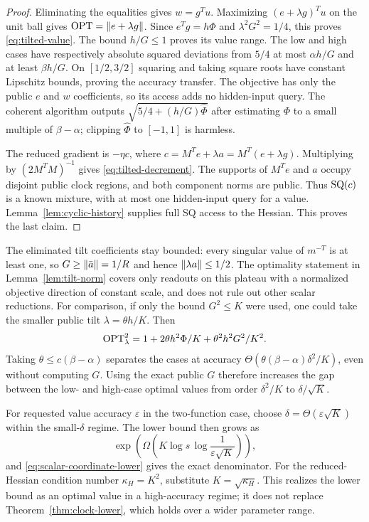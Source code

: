 \begin{proof}
Eliminating the equalities gives $w=g^Tu$.  Maximizing
$(e+\lambda g)^Tu$ on the unit ball gives $\operatorname{OPT}=\left\lVert e+\lambda g\right\rVert$.
Since $e^Tg=h\Phi$ and $\lambda^2G^2=1/4$, this proves
\eqref{eq:tilted-value}.  The bound $h/G\leq1$ proves its value range.
The low and high cases have respectively absolute squared deviations
from $5/4$ at most $\alpha h/G$ and at least $\beta h/G$.
On $[1/2,3/2]$ squaring and taking square roots have constant Lipschitz
bounds, proving the accuracy transfer.  The objective has only the
public $e$ and $w$ coefficients, so its access adds no hidden-input query.
The coherent algorithm outputs
$\sqrt{5/4+(h/G)\widehat\Phi}$ after estimating $\Phi$ to a small
multiple of $\beta-\alpha$; clipping $\widehat\Phi$ to $[-1,1]$ is harmless.

The reduced gradient is $-\eta c$, where
$c=M^Te+\lambda a=M^T(e+\lambda g)$.
Multiplying by $(2M^TM)^{-1}$ gives
\eqref{eq:tilted-decrement}.  The supports of $M^Te$ and $a$ occupy
disjoint public clock regions, and both component norms are public.
Thus $\mathrm{SQ}(c)$ is a known mixture, with at most one hidden-input query for a
value.  Lemma~\ref{lem:cyclic-history} supplies full SQ access to the
Hessian.  This proves the last claim.
\end{proof}

The eliminated tilt coefficients stay bounded: every singular value of
$m^{-T}$ is at least one, so
$G\geq\left\lVert\bar a\right\rVert=1/R$ and hence $\left\lVert\lambda a\right\rVert\leq1/2$.
The optimality statement in Lemma~\ref{lem:tilt-norm} covers only readouts
on this plateau with a normalized objective direction of constant scale,
and does not rule out other scalar reductions.
For comparison, if only the bound $G^2\leq K$ were used, one could take
the smaller public tilt $\lambda=\theta h/K$.  Then
\[
 \operatorname{OPT}_\lambda^2=1+2\theta h^2\Phi/K+\theta^2h^2G^2/K^2.
\]
Taking $\theta\leq c(\beta-\alpha)$ separates the cases at accuracy
$\Theta(\theta(\beta-\alpha)\delta^2/K)$, even without computing $G$.
Using the exact public $G$ therefore increases the gap between the low-
and high-case optimal values from order $\delta^2/K$ to $\delta/\sqrt K$.

For requested value accuracy $\varepsilon$ in the two-function case,
choose $\delta=\Theta(\varepsilon\sqrt K)$ within
the small-$\delta$ regime.  The lower bound then grows as
\[
 \exp\left(\Omega\left(K\log s\,
       \log\frac1{\varepsilon\sqrt K}\right)\right),
\]
and \eqref{eq:scalar-coordinate-lower} gives the exact denominator.
For the reduced-Hessian condition number $\kappa_H=K^2$, substitute
$K=\sqrt{\kappa_H}$.  This realizes the lower bound as an optimal value
in a high-accuracy regime; it does not replace
Theorem~\ref{thm:clock-lower}, which holds over a wider parameter range.

